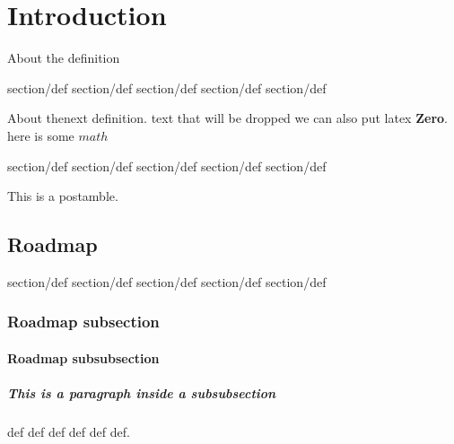 \chapter{Introduction}
\label{ch:intro}

About the definition

\begin{definition}


section/def section/def section/def
section/def section/def
\end{definition}


About thenext definition.
text that will be dropped we can also put latex  \textbf{Zero}.
here is some $math$

\begin{definition}
section/def section/def section/def
section/def section/def
\end{definition}

This is a postamble.

\section{Roadmap}
\label{sec:roadmap}



\begin{definition}
\label{def:one}
section/def section/def section/def
section/def section/def
\end{definition}



\subsection{Roadmap subsection}

\subsubsection{Roadmap subsubsection}
\paragraph{This is a paragraph inside a subsubsection}

\begin{definition}
\label{def:title}
  def def def
  def
  def def.
\end{definition}


